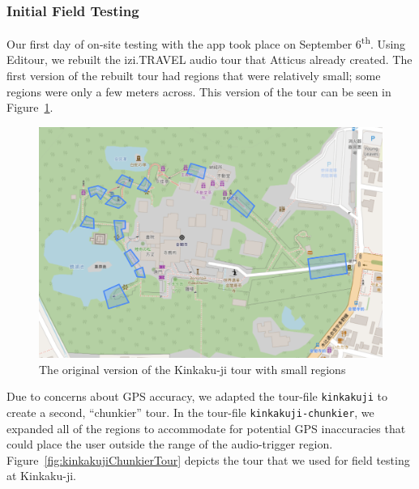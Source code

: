 \documentclass[a4paper, 10pt, american, titlepage]{article}
\begin{document}
\subsubsection{Initial Field Testing}
\label{sec:initialFieldTesting}

Our first day of on-site testing with the app took place on September
6\textsuperscript{th}. Using Editour, we rebuilt the izi.TRAVEL audio tour that
Atticus already created. The first version of the rebuilt tour had regions that
were relatively small; some regions were only a few meters across. This version
of the tour can be seen in Figure~\ref{fig:kinkakujiTour}.

\begin{figure}[h]
	\centering
	\includegraphics[width=\textwidth]{kinkakuji-tour.png}
	\caption[The original version of the Kinkaku-ji tour]{The original version
		of the Kinkaku-ji tour with small regions}
	\label{fig:kinkakujiTour}
\end{figure}

Due to concerns about GPS accuracy, we adapted the tour-file \texttt{kinkakuji}
to create a second, ``chunkier'' tour.  In the tour-file
\texttt{kinkakuji-chunkier}, we expanded all of the regions to accommodate for
potential GPS inaccuracies that could place the user outside the range of the
audio-trigger region.  Figure~\ref{fig:kinkakujiChunkierTour} depicts the tour
that we used for field testing at Kinkaku-ji.
\end{document}
